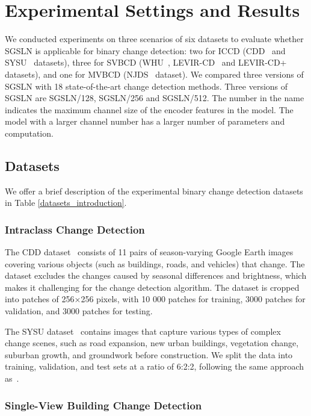 \documentclass[journal]{IEEEtran}
\begin{document}
\section{Experimental Settings and Results}

We conducted experiments on three scenarios of six datasets to evaluate whether SGSLN is applicable for binary change detection: two for ICCD (CDD~\cite{cdd} and SYSU~\cite{sysu} datasets), three for SVBCD (WHU~\cite{whu}, LEVIR-CD~\cite{sta} and LEVIR-CD+ datasets), and one for MVBCD (NJDS~\cite{njds} dataset). We compared three versions of SGSLN with 18 state-of-the-art change detection methods. Three versions of SGSLN are SGSLN/128, SGSLN/256 and SGSLN/512. The number in the name indicates the maximum channel size of the encoder features in the model. The model with a larger channel number has a larger number of parameters and computation. 

\subsection{Datasets}

We offer a brief description of the experimental binary change detection datasets in Table \ref{datasets_introduction}. 

\subsubsection{Intraclass Change Detection}

The CDD dataset~\cite{cdd} consists of 11 pairs of season-varying Google Earth images covering various objects (such as buildings, roads, and vehicles) that change. The dataset excludes the changes caused by seasonal differences and brightness, which makes it challenging for the change detection algorithm. The dataset is cropped into patches of 256×256 pixels, with 10 000 patches for training, 3000 patches for validation, and 3000 patches for testing.

The SYSU dataset~\cite{sysu} contains images that capture various types of complex change scenes, such as road expansion, new urban buildings, vegetation change, suburban growth, and groundwork before construction. We split the data into training, validation, and test sets at a ratio of 6:2:2, following the same approach as~\cite{sysu}.

\subsubsection{Single-View Building Change Detection}
\end{document}
